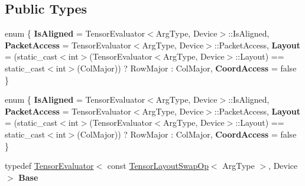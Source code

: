 \subsection*{Public Types}
\begin{DoxyCompactItemize}
\item 
\mbox{\label{struct_eigen_1_1_tensor_evaluator_3_01_tensor_layout_swap_op_3_01_arg_type_01_4_00_01_device_01_4_a776ab491d11471137e13d2543aee5780}} 
enum \{ {\bfseries Is\+Aligned} = Tensor\+Evaluator$<$Arg\+Type, Device$>$\+:\+:Is\+Aligned, 
{\bfseries Packet\+Access} = Tensor\+Evaluator$<$Arg\+Type, Device$>$\+:\+:Packet\+Access, 
{\bfseries Layout} = (static\+\_\+cast$<$int$>$(Tensor\+Evaluator$<$Arg\+Type, Device$>$\+:\+:Layout) == static\+\_\+cast$<$int$>$(Col\+Major)) ? Row\+Major \+: Col\+Major, 
{\bfseries Coord\+Access} = false
 \}
\item 
\mbox{\label{struct_eigen_1_1_tensor_evaluator_3_01_tensor_layout_swap_op_3_01_arg_type_01_4_00_01_device_01_4_a1e025c66a34a42c78f121ae929bb66ee}} 
enum \{ {\bfseries Is\+Aligned} = Tensor\+Evaluator$<$Arg\+Type, Device$>$\+:\+:Is\+Aligned, 
{\bfseries Packet\+Access} = Tensor\+Evaluator$<$Arg\+Type, Device$>$\+:\+:Packet\+Access, 
{\bfseries Layout} = (static\+\_\+cast$<$int$>$(Tensor\+Evaluator$<$Arg\+Type, Device$>$\+:\+:Layout) == static\+\_\+cast$<$int$>$(Col\+Major)) ? Row\+Major \+: Col\+Major, 
{\bfseries Coord\+Access} = false
 \}
\item 
\mbox{\label{struct_eigen_1_1_tensor_evaluator_3_01_tensor_layout_swap_op_3_01_arg_type_01_4_00_01_device_01_4_a7fb384490817bd637b679e949c359209}} 
typedef \hyperlink{struct_eigen_1_1_tensor_evaluator}{Tensor\+Evaluator}$<$ const \hyperlink{class_eigen_1_1_tensor_layout_swap_op}{Tensor\+Layout\+Swap\+Op}$<$ Arg\+Type $>$, Device $>$ {\bfseries Base}
\item 
\mbox{\label{struct_eigen_1_1_tensor_evaluator_3_01_tensor_layout_swap_op_3_01_arg_type_01_4_00_01_device_01_4_a53f5b7a8594a3bf0f4c8330daa2b49bc}} 

\end{DoxyCompactItemize}
